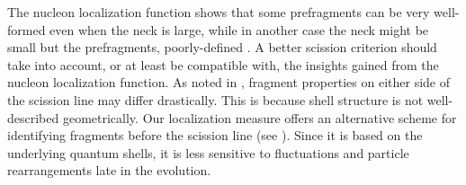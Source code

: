 The nucleon localization function shows that some prefragments can be very well-formed even when the neck is large, while in another case the neck might be small but the prefragments, poorly-defined \cite{Sadhukhan2017}. A better scission criterion should take into account, or at least be compatible with, the insights gained from the nucleon localization function. As noted in \cite{Younes2009}, fragment properties on either side of the scission line may differ drastically. This is because shell structure is not well-described geometrically. Our localization measure offers an alternative scheme for identifying fragments before the scission line (see \cite{Sadhukhan2017}). Since it is based on the underlying quantum shells, it is less sensitive to fluctuations and particle rearrangements late in the evolution.

%
%
